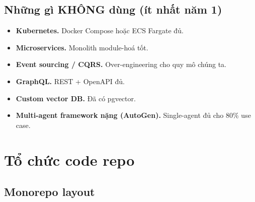 \documentclass[11pt,a4paper]{article}
\begin{document}
\subsection{Những gì KHÔNG dùng (ít nhất năm 1)}

\begin{itemize}
\item \textbf{Kubernetes.} Docker Compose hoặc ECS Fargate đủ.
\item \textbf{Microservices.} Monolith module-hoá tốt.
\item \textbf{Event sourcing / CQRS.} Over-engineering cho quy mô chúng ta.
\item \textbf{GraphQL.} REST + OpenAPI đủ.
\item \textbf{Custom vector DB.} Đã có pgvector.
\item \textbf{Multi-agent framework nặng (AutoGen).} Single-agent đủ cho 80\% use case.
\end{itemize}

\clearpage

\section{Tổ chức code repo}

\subsection{Monorepo layout}
\end{document}
